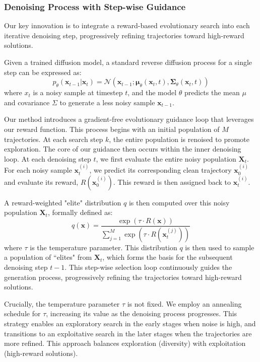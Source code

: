 \subsubsection{Denoising Process with Step-wise Guidance} Our key innovation is to integrate a reward-based evolutionary search into each iterative denoising step, progressively refining trajectories toward high-reward solutions.

Given a trained diffusion model, a standard reverse diffusion process for a single step can be expressed as: 
\begin{equation} p_\theta(\mathbf{x}_{t-1}|\mathbf{x}_t) = \mathcal{N}(\mathbf{x}_{t-1}; \boldsymbol{\mu}_\theta(\mathbf{x}_t, t), \boldsymbol{\Sigma}_\theta(\mathbf{x}_t, t)) \end{equation}
 where $x_t$ is a noisy sample at timestep $t$, and the model $\theta$ predicts the mean $\mu$ and covariance $\Sigma$ to generate a less noisy sample $\mathbf{x}_{t-1}$.

Our method introduces a gradient-free evolutionary guidance loop that leverages our reward function. This process begins with an initial population of $M$ trajectories. At each search step $k$, the entire population is renoised to promote exploration. The core of our guidance then occurs within the inner denoising loop. At each denoising step $t$, we first evaluate the entire noisy population $\mathbf{X}_t$. For each noisy sample $\mathbf{x}_t^{(i)}$, we predict its corresponding clean trajectory $\mathbf{x}_0^{(i)}$ and evaluate its reward, $R(\mathbf{x}_0^{(i)})$. This reward is then assigned back to  $\mathbf{x}_t^{(i)}$.

A reward-weighted "elite" distribution $q$ is then computed over this noisy population $\mathbf{X}_t$, formally defined as:
\begin{equation}
q(\mathbf{x}) = \frac{\exp(\tau \cdot R(\mathbf{x}))}{\sum_{j=1}^{M} \exp(\tau \cdot R(\mathbf{x}_t^{(j)}))}
\end{equation}
where $\tau$ is the temperature parameter. This distribution $q$ is then used to sample a population of ``elites" from $\mathbf{X}_t$, which forms the basis for the subsequent denoising step $t-1$. This step-wise selection loop continuously guides the generation process, progressively refining the trajectories toward high-reward solutions.

Crucially, the temperature parameter $\tau$ is not fixed. We employ an annealing schedule for $\tau$, increasing its value as the denoising process progresses. This strategy enables an exploratory search in the early stages when noise is high, and transitions to an exploitative search in the later stages when the trajectories are more refined. This approach balances exploration (diversity) with exploitation (high-reward solutions).

